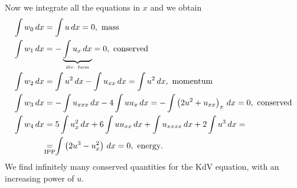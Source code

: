 Now we integrate all the equations in \(x\) and we obtain
\begin{align*}
    \int w_0 \, dx & = \int u \, dx = 0, \text{ mass}                                                                               \\
    \int w_1 \, dx & = -\underbrace{\int u_x \, dx}_{\text{\tiny div. form}} = 0, \text{ conserved}                                 \\
    \int w_2 \, dx & = \int u^2 \, dx - \int u_{xx} \, dx = \int u^2 \, dx, \text{ momentum}                                        \\
    \int w_3 \, dx & = -\int u_{xxx} \, dx - 4 \int u u_x \, dx = - \int \left(2 u^2 + u_{xx}\right)_x \, dx = 0, \text{ conserved} \\
    \int w_4 \, dx & = 5 \int u_x^2 \, dx + 6 \int u u_{xx} \, dx + \int u_{xxxx} \, dx + 2 \int u^3 \, dx =                        \\
                   & \underset{\mathclap{\text{IPP}}}{=} \int \left(2 u^3 - u_x^2\right) \, dx = 0, \text{ energy}.
\end{align*}
We find infinitely many conserved quantities for the KdV equation, with an increasing power of \(u\).

\newpage
